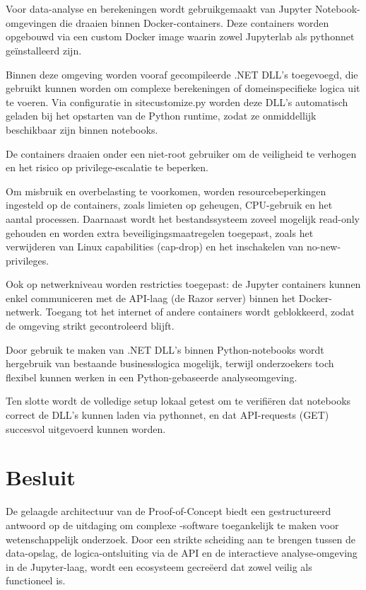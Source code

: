 \section{}
\label{ch:architecture-jupyter}

Voor data-analyse en berekeningen wordt gebruikgemaakt van Jupyter Notebook-omgevingen die draaien binnen Docker-containers. Deze containers worden opgebouwd via een custom Docker image waarin zowel Jupyterlab als pythonnet geïnstalleerd zijn.

Binnen deze omgeving worden vooraf gecompileerde .NET DLL’s toegevoegd, die gebruikt kunnen worden om complexe berekeningen of domeinspecifieke logica uit te voeren. Via configuratie in sitecustomize.py worden deze DLL’s automatisch geladen bij het opstarten van de Python runtime, zodat ze onmiddellijk beschikbaar zijn binnen notebooks.

De containers draaien onder een niet-root gebruiker om de veiligheid te verhogen en het risico op privilege-escalatie te beperken.

Om misbruik en overbelasting te voorkomen, worden resourcebeperkingen ingesteld op de containers, zoals limieten op geheugen, CPU-gebruik en het aantal processen. Daarnaast wordt het bestandssysteem zoveel mogelijk read-only gehouden en worden extra beveiligingsmaatregelen toegepast, zoals het verwijderen van Linux capabilities (cap-drop) en het inschakelen van no-new-privileges.

Ook op netwerkniveau worden restricties toegepast: de Jupyter containers kunnen enkel communiceren met de API-laag (de Razor server) binnen het Docker-netwerk. Toegang tot het internet of andere containers wordt geblokkeerd, zodat de omgeving strikt gecontroleerd blijft.

Door gebruik te maken van .NET DLL’s binnen Python-notebooks wordt hergebruik van bestaande businesslogica mogelijk, terwijl onderzoekers toch flexibel kunnen werken in een Python-gebaseerde analyseomgeving.

Ten slotte wordt de volledige setup lokaal getest om te verifiëren dat notebooks correct de DLL’s kunnen laden via pythonnet, en dat API-requests (GET) succesvol uitgevoerd kunnen worden.

\section{Besluit}
De gelaagde architectuur van de Proof-of-Concept biedt een gestructureerd antwoord op de uitdaging om complexe -software toegankelijk te maken voor wetenschappelijk onderzoek. Door een strikte scheiding aan te brengen tussen de data-opslag, de logica-ontsluiting via de API en de interactieve analyse-omgeving in de Jupyter-laag, wordt een ecosysteem gecreëerd dat zowel veilig als functioneel is.

